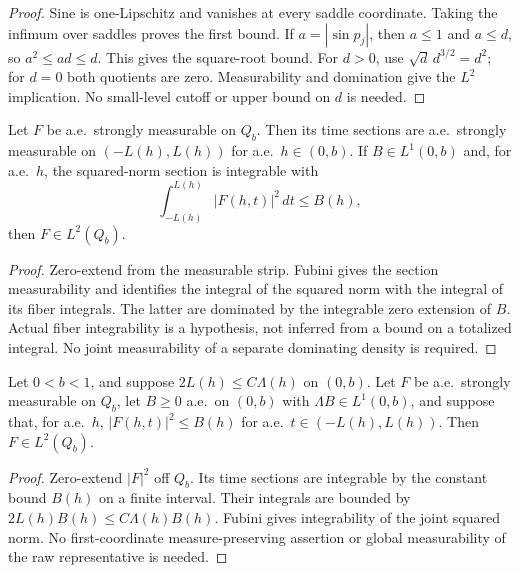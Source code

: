 \begin{proof}
\leanok
Sine is one-Lipschitz and vanishes at every saddle coordinate.
Taking the infimum over saddles proves the first bound.
If $a=|\sin p_j|$, then $a\le1$ and $a\le d$, so
$a^2\le ad\le d$. This gives the square-root bound.
For $d>0$, use $\sqrt d\,d^{3/2}=d^2$; for $d=0$ both quotients
are zero. Measurability and domination give the $L^2$ implication.
No small-level cutoff or upper bound on $d$ is needed.
\end{proof}

\begin{lemma}
\label{lem:quarter-fiber-summation}
\leanok
Let $F$ be a.e.\ strongly measurable on $Q_b$.
Then its time sections are a.e.\ strongly measurable on
$(-L(h),L(h))$ for a.e.\ $h\in(0,b)$.
If $B\in L^1(0,b)$ and, for a.e.\ $h$, the squared-norm section is
integrable with
\[
 \int_{-L(h)}^{L(h)}|F(h,t)|^2\,dt\le B(h),
\]
then $F\in L^2(Q_b)$.
\end{lemma}

\begin{proof}
\leanok
Zero-extend from the measurable strip.
Fubini gives the section measurability and identifies the integral of
the squared norm with the integral of its fiber integrals.
The latter are dominated by the integrable zero extension of $B$.
Actual fiber integrability is a hypothesis, not inferred from a bound
on a totalized integral. No joint measurability of a separate dominating
density is required.
\end{proof}

\begin{lemma}
\label{lem:quarter-strip-summation}
\leanok
Let $0<b<1$, and suppose $2L(h)\le C\Lambda(h)$ on $(0,b)$.
Let $F$ be a.e.\ strongly measurable on $Q_b$, let $B\ge0$ a.e.\ on
$(0,b)$ with $\Lambda B\in L^1(0,b)$, and suppose that, for a.e.\ $h$,
$|F(h,t)|^2\le B(h)$ for a.e.\ $t\in(-L(h),L(h))$.
Then $F\in L^2(Q_b)$.
\end{lemma}

\begin{proof}
\leanok
Zero-extend $|F|^2$ off $Q_b$. Its time sections are integrable by the
constant bound $B(h)$ on a finite interval.
Their integrals are bounded by $2L(h)B(h)\le C\Lambda(h)B(h)$.
Fubini gives integrability of the joint squared norm.
No first-coordinate measure-preserving assertion or global
measurability of the raw representative is needed.
\end{proof}

